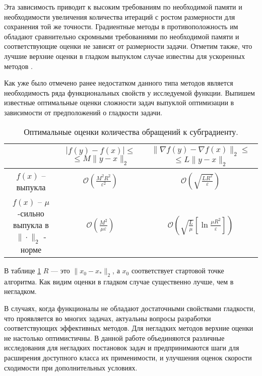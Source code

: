 Эта зависимость приводит к высоким требованиям по необходимой памяти и необходимости увеличения количества итераций с ростом размерности для сохранения той же точности. Градиентные методы в противоположность им обладают сравнительно скромными требованиями по необходимой памяти и соответствующие оценки не зависят от размерности задачи. Отметим также, что лучшие верхние оценки в гладком выпуклом случае известны для ускоренных методов \cite{Nesterov1983}.

Как уже было отмечено ранее недостатком данного типа методов является необходимость ряда функциональных свойств у исследуемой функции. Выпишем известные оптимальные оценки сложности задач выпуклой оптимизации в зависимости от предположений о гладкости задачи.

\begin{table}[h]
    \caption{Оптимальные оценки количества обращений к субградиенту.}
    \label{est_tbl}
    \centering
    \begin{tabular}{|c|c|c|}
        \hline
         & \makecell{$|f(y) - f(x)| \leq$ \\ $\leq M \| y - x \|_2$} & \makecell{$\|\nabla f(y) - \nabla f(x)\|_2 \leq $\\ $\leq L \| y - x \|_2$} \\
        \hline
        $f(x)$ -- выпукла & $\mathcal{O} \left( \frac{M^2 R^2}{\varepsilon^2} \right)$ & $\mathcal{O} \left( \sqrt{\frac{L R^2}{\varepsilon}} \right)$ \\
        \hline
        \makecell{$f(x)$ -- $\mu$-сильно \\ выпукла в $\| \cdot \|_2$ - норме} & $\mathcal{O} \left( \frac{M^2}{\mu \varepsilon} \right)$ & $\mathcal{O} \left( \sqrt{\frac{L}{\mu}} \left[\ln{\frac{\mu R^2}{\varepsilon}}\right] \right)$ \\
        \hline
    \end{tabular}
\end{table}
В таблице \ref{est_tbl} $R$ --- это $\|x_0 - x_*\|_2 $, а $x_0$ соответствует стартовой точке алгоритма. Как видим оценки в гладком случае существенно лучше, чем в негладком.


В случаях, когда функционалы не обладают достаточными свойствами гладкости, что проявляется во многих задачах, актуальны вопросы разработки соответствующих эффективных методов. Для негладких методов верхние оценки не настолько оптимистичны. В данной работе объединяются различные исследования для негладких постановок задач и предпринимаются шаги для расширения доступного класса их применимости, и улучшения оценок скорости сходимости при дополнительных условиях. 

